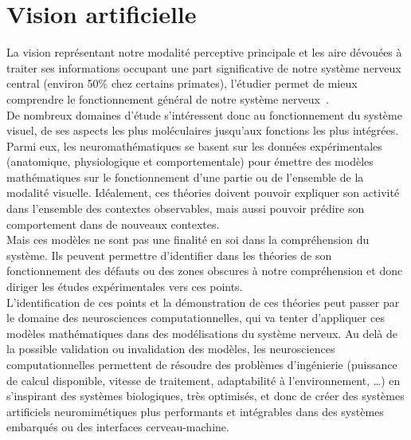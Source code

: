 \section{Vision artificielle}
La vision représentant notre modalité perceptive principale et les aire dévouées à traiter ses informations occupant une part significative de notre système nerveux central (environ 50\% chez certains primates), l'étudier permet de mieux comprendre le fonctionnement général de notre système nerveux~\autocite{Zhaoping2014}.\\
De nombreux domaines d'étude s'intéressent donc au fonctionnement du système visuel, de ses aspects les plus moléculaires jusqu'aux fonctions les plus intégrées. Parmi eux, les neuromathématiques se basent sur les données expérimentales (anatomique, physiologique et comportementale) pour émettre des modèles mathématiques sur le fonctionnement d'une partie ou de l'ensemble de la modalité visuelle. Idéalement, ces théories doivent pouvoir expliquer son activité dans l'ensemble des contextes observables, mais aussi pouvoir prédire son comportement dans de nouveaux contextes\autocite{Zhaoping2014}.\\
Mais ces modèles ne sont pas une finalité en soi dans la compréhension du système. Ils peuvent permettre d'identifier dans les théories de son fonctionnement des défauts ou des zones obscures à notre compréhension et donc diriger les études expérimentales vers ces points\autocite{Zhaoping2014}.\\
L'identification de ces points et la démonstration de ces théories peut passer par le domaine des neurosciences computationnelles, qui va tenter d'appliquer ces modèles mathématiques dans des modélisations du système nerveux. Au delà de la possible validation ou invalidation des modèles, les neurosciences computationnelles permettent de résoudre des problèmes d'ingénierie (puissance de calcul disponible, vitesse de traitement, adaptabilité à l'environnement, \ldots) en s'inspirant des systèmes biologiques, très optimisés, et donc de créer des systèmes artificiels neuromimétiques plus performants et intégrables dans des systèmes embarqués ou des interfaces cerveau-machine.\\

